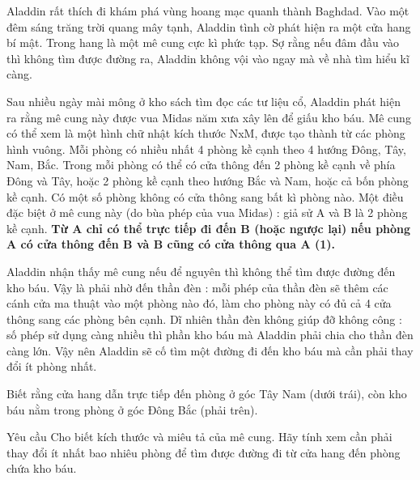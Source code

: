 Aladdin rất thích đi khám phá vùng hoang mạc quanh thành Baghdad. Vào một đêm sáng trăng trời quang mây tạnh, Aladdin tình cờ phát hiện ra một cửa hang bí mật. Trong hang là một mê cung cực kì phức tạp. Sợ rằng nếu đâm đầu vào thì không tìm được đường ra, Aladdin không vội vào ngay mà về nhà tìm hiểu kĩ càng.

Sau nhiều ngày mài mông ở kho sách tìm đọc các tư liệu cổ, Aladdin phát hiện ra rằng mê cung này được vua Midas năm xưa xây lên để giấu kho báu. Mê cung có thể xem là một hình chữ nhật kích thước NxM, được tạo thành từ các phòng hình vuông. Mỗi phòng có nhiều nhất 4 phòng kề cạnh theo 4 hướng Đông, Tây, Nam, Bắc. Trong mỗi phòng có thể có cửa thông đến 2 phòng kề cạnh về phía Đông và Tây, hoặc 2 phòng kề cạnh theo hướng Bắc và Nam, hoặc cả bốn phòng kề cạnh. Có một số phòng không có cửa thông sang bất kì phòng nào. Một điều đặc biệt ở mê cung này (do bùa phép của vua Midas) : giả sử A và B là 2 phòng kề cạnh. \textbf{Từ A chỉ có thể trực tiếp đi đến B (hoặc ngược lại) nếu phòng A có cửa thông đến B và B cũng có cửa thông qua A (1).}

Aladdin nhận thấy mê cung nếu để nguyên thì không thể tìm được đường đến kho báu. Vậy là phải nhờ đến thần đèn : mỗi phép của thần đèn sẽ thêm các cánh cửa ma thuật vào một phòng nào đó, làm cho phòng này có đủ cả 4 cửa thông sang các phòng bên cạnh. Dĩ nhiên thần đèn không giúp đỡ không công : số phép sử dụng càng nhiều thì phần kho báu mà Aladdin phải chia cho thần đèn càng lớn. Vậy nên Aladdin sẽ cố tìm một đường đi đến kho báu mà cần phải thay đổi ít phòng nhất.

Biết rằng cửa hang dẫn trực tiếp đến phòng ở góc Tây Nam (dưới trái), còn kho báu nằm trong phòng ở góc Đông Bắc (phải trên).

Yêu cầu
Cho biết kích thước và miêu tả của mê cung. Hãy tính xem cần phải thay đổi ít nhất bao nhiêu phòng để tìm được đường đi từ cửa hang đến phòng chứa kho báu.